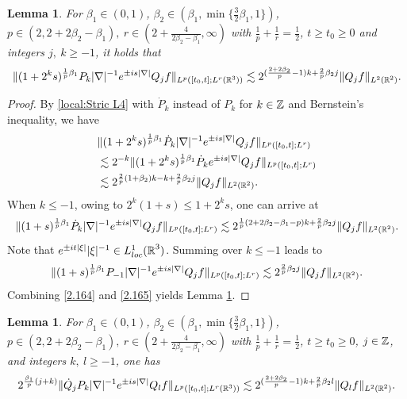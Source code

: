 \documentclass[11pt,twoside]{article}
\def\Z{\mathop{\mathbb Z\kern 0pt}\nolimits}
\def\R{\mathop{\mathbb R\kern 0pt}\nolimits}
\def\f{\frac}
\def\ls{\lesssim}
\newcommand{\pk}{\dot{P}_k}
\newcommand{\q}{\dot{Q}}
\theoremstyle{plain}
\newtheorem{lemma}[theorem]{Lemma}
\theoremstyle{definition}
\numberwithin{equation}{section}
\begin{document}
	\begin{lemma}\label{lem:Localized Strichartz estimate 5}
		For $\beta_1\in(0,1)$, $\beta_2\in(\beta_1,\min\{\f32\beta_1,1\})$, $p\in(2,2+2\beta_2-\beta_1),\ r\in(2+\f{4}{2\beta_2-\beta_1},\infty)$ with $\f1p+\f1r=\f12$, $t\ge t_0\ge 0$ and integers $j,\ k\ge -1$, it holds that
		\begin{equation}\label{local:Stric 5}
			\|(1+2^ks)^{\f1p \beta_1}P_k |\nabla|^{-1}e^{\pm is|\nabla|}Q_jf\|_{L^p([t_0,t];L^r(\R^3))}
			\ls
			2^{(\f{2+2\beta_2}{p}-1)k +\f2p\beta_2 j}\|Q_jf\|_{L^2(\R^2)}.
		\end{equation}
	\end{lemma}
	\begin{proof}
		By \eqref{local:Stric L4} with $\pk$ instead of $P_k$ for $k\in\Z$ and Bernstein's inequality, we have
		\begin{equation}\label{2.164}
			\begin{split}
				&\|(1+2^ks)^{\f1p \beta_1}\pk |\nabla|^{-1}e^{\pm is|\nabla|}Q_jf\|_{L^p([t_0,t];L^r)}\\
				&\ls
				2^{-k}\|(1+2^ks)^{\f1p \beta_1} \pk e^{\pm is|\nabla|}Q_jf\|_{L^p([t_0,t];L^r)}\\
				&\ls
				2^{\f2p(1+\beta_2)k-k +\f2p\beta_2 j}\|Q_jf\|_{L^2(\R^2)}.
			\end{split}
		\end{equation}
		When $k\le-1$, owing to $2^k(1+s)\le 1+2^ks$, one can arrive at
		\begin{equation*}
			\|(1+s)^{\f1p \beta_1}\pk |\nabla|^{-1}e^{\pm is|\nabla|}Q_jf\|_{L^p([t_0,t];L^r)}
			\ls
			2^{\f1p(2+2\beta_2-\beta_1-p)k+\f2p\beta_2 j}\|Q_jf\|_{L^2(\R^2)}.
		\end{equation*}
		Note that $e^{\pm it|\xi|}|\xi|^{-1}\in L^1_{loc}(\R^3)$. Summing over $k\le -1$ leads to
		\begin{equation}\label{2.165}
			\|(1+s)^{\f1p \beta_1}P_{-1}|\nabla|^{-1}e^{\pm is|\nabla|}Q_jf\|_{L^p([t_0,t];L^r)}
			\ls
			2^{\f2p\beta_2 j}\|Q_jf\|_{L^2(\R^2)}.
		\end{equation}
		Combining \eqref{2.164} and \eqref{2.165} yields Lemma \ref{lem:Localized Strichartz estimate 5}.
	\end{proof}
	\begin{lemma}\label{lem:Localized Strichartz estimate 6}
		For $\beta_1\in(0,1)$, $\beta_2\in(\beta_1,\min\{\f32\beta_1,1\})$, $p\in(2,2+2\beta_2-\beta_1),\ r\in(2+\f{4}{2\beta_2-\beta_1},\infty)$
with $\f1p+\f1r=\f12$, $t\ge t_0\ge 0$, $j\in\Z$, and integers $k,\ l\ge -1$, one has
		\begin{equation}\label{local:Stric 6}
			2^{\f{\beta_1}{p}(j+k)}\|\q_jP_{k}|\nabla|^{-1}e^{\pm is|\nabla|}Q_lf\|_{L^p([t_0,t];L^r(\R^3))}
			\ls
			2^{(\f{2+2\beta_2}{p}-1)k +\f2p\beta_2 l}\|Q_lf\|_{L^2(\R^2)}.
		\end{equation}
	\end{lemma}
\end{document}
